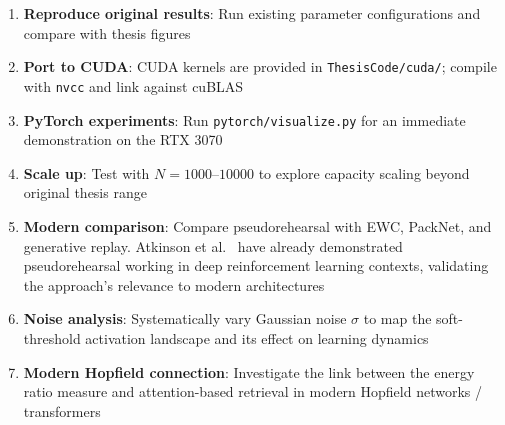 \documentclass[11pt,a4paper]{article}
\begin{document}
\begin{enumerate}
    \item \textbf{Reproduce original results}: Run existing parameter configurations and compare with thesis figures
    \item \textbf{Port to CUDA}: CUDA kernels are provided in \texttt{ThesisCode/cuda/}; compile with \texttt{nvcc} and link against cuBLAS
    \item \textbf{PyTorch experiments}: Run \texttt{pytorch/visualize.py} for an immediate demonstration on the RTX 3070
    \item \textbf{Scale up}: Test with $N=1000$--$10000$ to explore capacity scaling beyond original thesis range
    \item \textbf{Modern comparison}: Compare pseudorehearsal with EWC, PackNet, and generative replay. Atkinson et al.~\cite{atkinson2018pseudo} have already demonstrated pseudorehearsal working in deep reinforcement learning contexts, validating the approach's relevance to modern architectures
    \item \textbf{Noise analysis}: Systematically vary Gaussian noise $\sigma$ to map the soft-threshold activation landscape and its effect on learning dynamics
    \item \textbf{Modern Hopfield connection}: Investigate the link between the energy ratio measure and attention-based retrieval in modern Hopfield networks / transformers
\end{enumerate}



\end{document}
